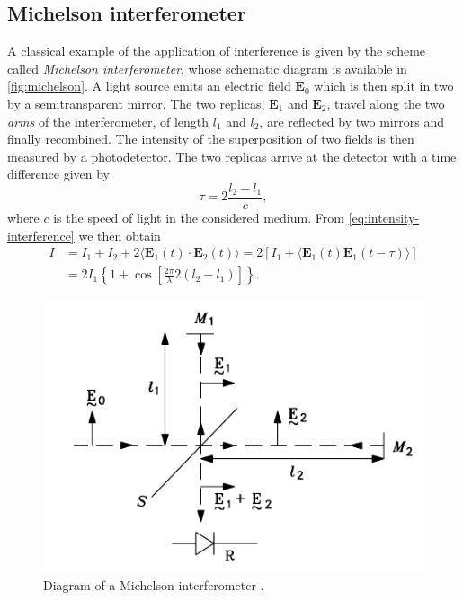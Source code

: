 \subsection{Michelson interferometer}
\label{sub:michelson}
A classical example of the application of interference is given by the scheme called \emph{Michelson interferometer}, whose schematic diagram is available in \autoref{fig:michelson}. A light source emits an electric field $\textbf{E}_0$ which is then split in two by a semitransparent mirror. The two replicas, $\textbf{E}_1$ and $\textbf{E}_2$, travel along the two \emph{arms} of the interferometer, of length $l_1$ and $l_2$, are reflected by two mirrors and finally recombined. The intensity of the superposition of two fields is then measured by a photodetector. The two replicas arrive at the detector with a time difference given by
\begin{equation}
	\tau = 2\frac{l_2 - l_1}{c},
\end{equation}
where $c$ is the speed of light in the considered medium. From \autoref{eq:intensity-interference} we then obtain
\begin{align}\label{eq:michelson-intensity}
	I &= I_1 + I_2 + 2 \langle\textbf{E}_1(t) \cdot \textbf{E}_2(t)\rangle =  2 \left[I_1 + \langle\textbf{E}_1(t) \textbf{E}_1(t-\tau) \rangle\right]\\
	 &= 2I_1\left\{ 1 + \cos\left[\frac{2\pi}{\lambda}2(l_2-l_1)\right]\right\}.
\end{align}


\begin{figure}[hbt]
	\myfloatalign
	\includegraphics[width=0.7\linewidth]{gfx/michelson}
	\caption{Diagram of a Michelson interferometer \cite{Someda2006}. }\label{fig:michelson}
\end{figure}

